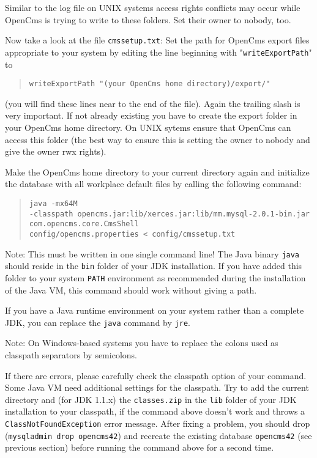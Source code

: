 Similar to the log file on UNIX systems access rights conflicts may occur while
OpenCms is trying to write to these folders. Set their owner to nobody, too.

Now take a look at the file \texttt{cmssetup.txt}:
Set the path for OpenCms export files appropriate to your system by editing
the line beginning with "\texttt{writeExportPath}" to 

\begin{quote}
\texttt{writeExportPath "(your OpenCms home directory)/export/"}
\end{quote}

(you will find these lines near to the end of the file).
Again the trailing slash is very important.
If not already existing you have to create the export folder in your OpenCms home
directory. On UNIX sytems ensure that OpenCms can access this folder
(the best way to ensure this is setting the owner to nobody and give
the owner rwx rights). 

Make the OpenCms home directory to your current directory again and
initialize the database with all workplace default files by calling the following command:

\begin{quote}
\texttt{java -mx64M \\
-classpath opencms.jar:lib/xerces.jar:lib/mm.mysql-2.0.1-bin.jar\\
com.opencms.core.CmsShell\\
config/opencms.properties < config/cmssetup.txt}
\end{quote}

Note: This must be written in one single command line! The Java binary \texttt{java} should 
reside in the \texttt{bin} folder of your JDK installation. If you have added this folder to your 
system \texttt{PATH} environment as recommended during the installation of the Java VM,
this command should work without giving a path.

If you have a Java runtime environment 
on your system rather than a complete JDK, you
can replace the \texttt{java} command by \texttt{jre}.

Note: On Windows-based systems you have to replace the colons used as classpath separators 
by semicolons.

If there are errors, please carefully check the classpath option of your command.
Some Java VM need additional settings for the classpath. Try to add the current directory 
and (for JDK 1.1.x) the \texttt{classes.zip} in the \texttt{lib} folder of your JDK installation to your 
classpath, if the command above doesn't work and throws a \texttt{ClassNotFoundException} error message.
After fixing a problem, you should drop (\texttt{mysqladmin drop opencms42}) and recreate 
the existing database \texttt{opencms42} (see previous section) before 
running the command above for a second time.

